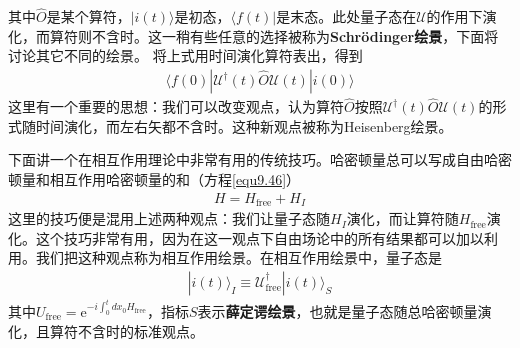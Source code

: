 其中$\hat{O}$是某个算符，$|i(t)\rangle$是初态，$\langle f(t)|$是末态。此处量子态在$\mathcal{U}$的作用下演化，而算符则不含时。这一稍有些任意的选择被称为\textbf{Schr\"{o}dinger绘景}，下面将讨论其它不同的绘景。
将上式用时间演化算符表出，得到
\begin{align}\label{equ9.57}
\langle f(0)|\mathcal{U}^\dag(t)\hat{O}\mathcal{U}(t)|i(0)\rangle
\end{align}
这里有一个重要的思想：我们可以改变观点，认为算符$\hat{O}$按照$\mathcal{U}^\dag(t) \hat{O}\mathcal{U}(t)$的形式随时间演化，而左右矢都不含时。这种新观点被称为Heisenberg绘景。

下面讲一个在相互作用理论中非常有用的传统技巧。哈密顿量总可以写成自由哈密顿量和相互作用哈密顿量的和（方程\ref{equ9.46}）
\begin{align}\label{equ9.58}
H=H_\text{free}+H_I
\end{align}
这里的技巧便是混用上述两种观点：我们让量子态随$H_I$演化，而让算符随$H_\text{free}$演化。这个技巧非常有用，因为在这一观点下自由场论中的所有结果都可以加以利用。我们把这种观点称为相互作用绘景。在相互作用绘景中，量子态是
\begin{align}\label{equ9.59}
|i(t)\rangle_I\equiv\mathcal{U}^\dag_\text{free}|i(t)\rangle_S
\end{align}
其中$U_\text{free}=\text{e}^{-i\int_0^tdx_0 H_\text{free}}$，指标$S$表示\textbf{薛定谔绘景}，也就是量子态随总哈密顿量演化，且算符不含时的标准观点。

